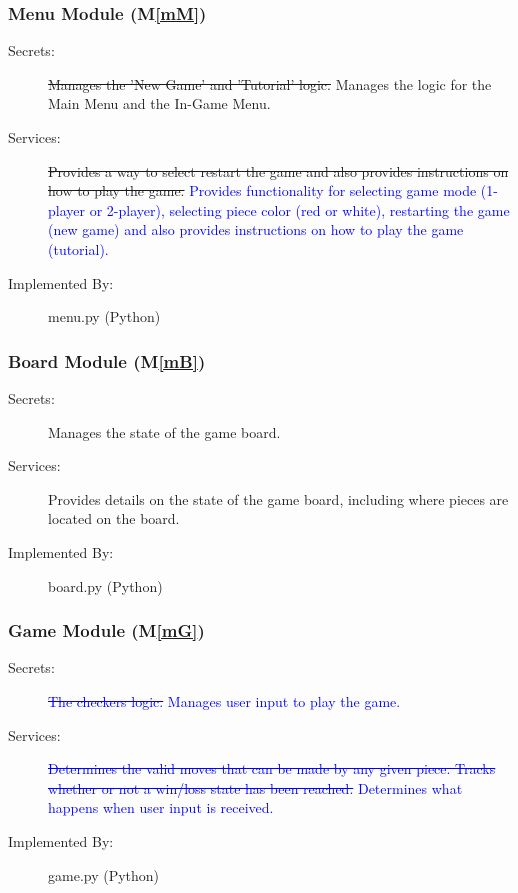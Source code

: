 \documentclass[12pt, titlepage]{article}
\newcommand{\mref}[1]{M\ref{#1}}
\begin{document}
\subsubsection{Menu Module (\mref{mM})}

\begin{description}
\item[Secrets:] \st{Manages the 'New Game' and 'Tutorial' logic.} {\color{blue} Manages the logic for the Main Menu and the In-Game Menu.}
\item[Services:] \st{Provides a way to select restart the game and also provides instructions on how to play the game.} \textcolor{blue} {Provides functionality for selecting game mode (1-player or 2-player), selecting piece color (red or white), restarting the game (new game) and also provides instructions on how to play the game (tutorial).}
\item[Implemented By:] menu.py (Python)
\end{description}

\subsubsection{Board Module (\mref{mB})}

\begin{description}
\item[Secrets:] Manages the state of the game board.
\item[Services:] Provides details on the state of the game board, including where pieces are located on the board.
\item[Implemented By:] board.py (Python)
\end{description}

\subsubsection{Game Module (\mref{mG})}

\begin{description}
\item[Secrets:] \textcolor{blue}{\st{The checkers logic.} Manages user input to play the game.}
\item[Services:] \textcolor{blue}{\st{ Determines the valid moves that can be made by any given piece. Tracks whether or not a win/loss state has been reached.} Determines what happens when user input is received.}
\item[Implemented By:] game.py (Python)
\end{description}
\end{document}
